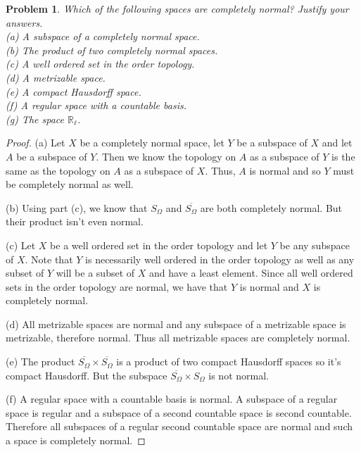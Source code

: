 \documentclass{article}
\newtheorem{problem}{Problem}
\begin{document}
\begin{problem}
Which of the following spaces are completely normal? Justify your answers.\\
(a) A subspace of a completely normal space.\\
(b) The product of two completely normal spaces.\\
(c) A well ordered set in the order topology.\\
(d) A metrizable space.\\
(e) A compact Hausdorff space.\\
(f) A regular space with a countable basis.\\
(g) The space $\mathbb{R}_{\ell}$.
\end{problem}
\begin{proof}
(a) Let $X$ be a completely normal space, let $Y$ be a subspace of $X$ and let $A$ be a subspace of $Y$. Then we know the topology on $A$ as a subspace of $Y$ is the same as the topology on $A$ as a subspace of $X$. Thus, $A$ is normal and so $Y$ must be completely normal as well.

(b) Using part (c), we know that $S_{\Omega}$ and $\overline{S_{\Omega}}$ are both completely normal. But their product isn't even normal.

(c) Let $X$ be a well ordered set in the order topology and let $Y$ be any subspace of $X$. Note that $Y$ is necessarily well ordered in the order topology as well as any subset of $Y$ will be a subset of $X$ and have a least element. Since all well ordered sets in the order topology are normal, we have that $Y$ is normal and $X$ is completely normal.

(d) All metrizable spaces are normal and any subspace of a metrizable space is metrizable, therefore normal. Thus all metrizable spaces are completely normal.

(e) The product $\overline{S_{\Omega}} \times \overline{S_{\Omega}}$ is a product of two compact Hausdorff spaces so it's compact Hausdorff. But the subspace $\overline{S_{\Omega}} \times S_{\Omega}$ is not normal.

(f) A regular space with a countable basis is normal. A subspace of a regular space is regular and a subspace of a second countable space is second countable. Therefore all subspaces of a regular second countable space are normal and such a space is completely normal.


\end{proof}
\end{document}
